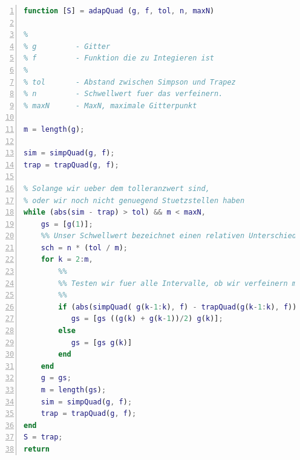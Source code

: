 \documentclass[11pt,a4paper,ngerman]{article}
\begin{document}
\begin{lstlisting}[language=matlab,numbers=left,caption=Adaptive Multilevel-Quadratur,label=lst:adaptiv]
function [S] = adapQuad (g, f, tol, n, maxN)

%
% g         - Gitter
% f         - Funktion die zu Integieren ist
%
% tol       - Abstand zwischen Simpson und Trapez
% n         - Schwellwert fuer das verfeinern.
% maxN      - MaxN, maximale Gitterpunkt

m = length(g);

sim = simpQuad(g, f);
trap = trapQuad(g, f);

% Solange wir ueber dem tolleranzwert sind,
% oder wir noch nicht genuegend Stuetzstellen haben
while (abs(sim - trap) > tol) && m < maxN,
    gs = [g(1)];
    %% Unser Schwellwert bezeichnet einen relativen Unterschied zur durchschnittlichen Grenze
    sch = n * (tol / m);
    for k = 2:m,
        %%
        %% Testen wir fuer alle Intervalle, ob wir verfeinern muessen
        %%
        if (abs(simpQuad( g(k-1:k), f) - trapQuad(g(k-1:k), f))) > sch
           gs = [gs ((g(k) + g(k-1))/2) g(k)];
        else
           gs = [gs g(k)]
        end
    end
    g = gs;
    m = length(gs);
    sim = simpQuad(g, f);
    trap = trapQuad(g, f);
end
S = trap;
return
\end{lstlisting}



\label{LastPage}
\end{document}
